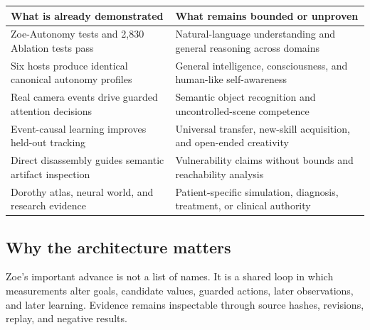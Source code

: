 \documentclass[11pt]{article}
\begin{document}
\begin{center}
\begin{tabularx}{\textwidth}{>{\raggedright\arraybackslash}X>{\raggedright\arraybackslash}X}
\toprule
\textbf{What is already demonstrated} & \textbf{What remains bounded or unproven}\\
\midrule
64 Zoe-Autonomy tests and 2,830 Ablation tests pass & Natural-language understanding and general reasoning across domains\\
Six hosts produce identical canonical autonomy profiles & General intelligence, consciousness, and human-like self-awareness\\
Real camera events drive guarded attention decisions & Semantic object recognition and uncontrolled-scene competence\\
Event-causal learning improves held-out tracking & Universal transfer, new-skill acquisition, and open-ended creativity\\
Direct disassembly guides semantic artifact inspection & Vulnerability claims without bounds and reachability analysis\\
Dorothy atlas, neural world, and research evidence & Patient-specific simulation, diagnosis, treatment, or clinical authority\\
\bottomrule
\end{tabularx}
\end{center}

\subsection{Why the architecture matters}

Zoe's important advance is not a list of names. It is a shared loop in which measurements alter goals, candidate values, guarded actions, later observations, and later learning. Evidence remains inspectable through source hashes, revisions, replay, and negative results.
\end{document}

